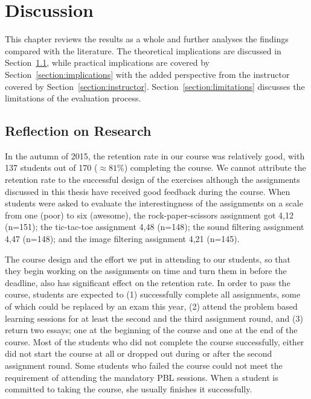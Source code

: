 \chapter{Discussion}
\label{chapter:discussion}

This chapter reviews the results as a whole and further analyses the findings compared with the literature. The theoretical implications are discussed in Section~\ref{section:theoretical}, while practical implications are covered by Section~\ref{section:implications} with the added perspective from the instructor covered by Section~\ref{section:instructor}. Section~\ref{section:limitations} discusses the limitations of the evaluation process.


\section{Reflection on Research}
\label{section:theoretical}

In the autumn of 2015, the retention rate in our course was relatively good, with 137 students out of 170 ($\approx 81\%$) completing the course. We cannot attribute the retention rate to the successful design of the exercises although the assignments discussed in this thesis have received good feedback during the course. When students were asked to evaluate the interestingness of the assignments on a scale from one (poor) to six (awesome), the rock-paper-scissors assignment got 4,12 (n=151); the tic-tac-toe assignment 4,48 (n=148); the sound filtering assignment 4,47 (n=148); and the image filtering assignment 4,21 (n=145).

The course design and the effort we put in attending to our students, so that they begin working on the assignments on time and turn them in before the deadline, also has significant effect on the retention rate. In order to pass the course, students are expected to (1) successfully complete all assignments, some of which could be replaced by an exam this year, (2) attend the problem based learning sessions for at least the second and the third assignment round, and (3) return two essays; one at the beginning of the course and one at the end of the course. Most of the students who did not complete the course successfully, either did not start the course at all or dropped out during or after the second assignment round. Some students who failed the course could not meet the requirement of attending the mandatory PBL sessions. When a student is committed to taking the course, she usually finishes it successfully.

